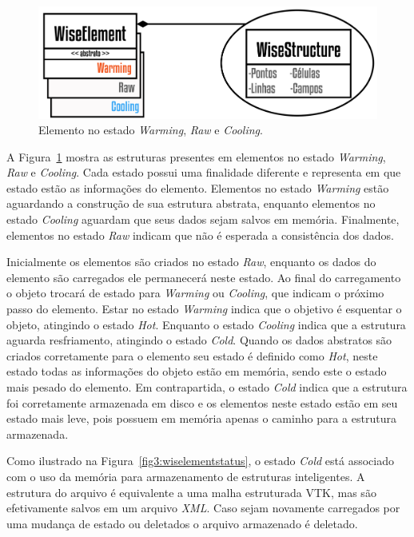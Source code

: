 \begin{figure}[!htbp]
	\centering
	\includegraphics[scale=1.85]{Figures/WiseElementWarming@16x.png}
	\caption{Elemento no estado \textit{Warming}, \textit{Raw} e \textit{Cooling}.}
	\label{fig4:wiselementwarming}
\end{figure}

A Figura~\ref{fig4:wiselementwarming} mostra as estruturas presentes em elementos no estado \textit{Warming}, \textit{Raw} e \textit{Cooling}. Cada estado possui uma finalidade diferente e representa em que estado estão as informações do elemento. Elementos no estado \textit{Warming} estão aguardando a construção de sua estrutura abstrata, enquanto elementos  no estado \textit{Cooling} aguardam que seus dados sejam salvos em memória. Finalmente, elementos no estado \textit{Raw} indicam que não é esperada a consistência dos dados.

Inicialmente os elementos são criados no estado \textit{Raw}, enquanto os dados do elemento são carregados ele permanecerá neste estado. Ao final do carregamento o objeto trocará de estado para \textit{Warming} ou \textit{Cooling}, que indicam o próximo passo do elemento. Estar no estado \textit{Warming} indica que o objetivo é esquentar o objeto, atingindo o estado \textit{Hot}. Enquanto o estado \textit{Cooling} indica que a estrutura aguarda resfriamento, atingindo o estado \textit{Cold}. Quando os dados abstratos são criados corretamente para o elemento seu estado é definido como \textit{Hot}, neste estado todas as informações do objeto estão em memória, sendo este o estado mais pesado do elemento. Em contrapartida, o estado \textit{Cold} indica que a estrutura foi corretamente armazenada em disco e os elementos neste estado estão em seu estado mais leve, pois possuem em memória apenas o caminho para a estrutura armazenada.

Como ilustrado na Figura~\ref{fig3:wiselementstatus}, o estado \textit{Cold} está associado com o uso da memória para armazenamento de estruturas inteligentes. A estrutura do arquivo é equivalente a uma malha estruturada VTK, mas são efetivamente salvos em um arquivo \textit{XML}. Caso sejam novamente carregados por uma mudança de estado ou deletados o arquivo armazenado é deletado. 

